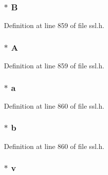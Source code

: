 \subsubsection[{\texorpdfstring{B}{B}}]{ $\ast$ B}\hypertarget{structsrp__ctx__st_af004f723529f12aa9f6eba50d907cfc6}{}\label{structsrp__ctx__st_af004f723529f12aa9f6eba50d907cfc6}


Definition at line 859 of file ssl.\+h.

\subsubsection[{\texorpdfstring{A}{A}}]{ $\ast$ A}\hypertarget{structsrp__ctx__st_a14b5ee5b9cc93634ae591ff33a985689}{}\label{structsrp__ctx__st_a14b5ee5b9cc93634ae591ff33a985689}


Definition at line 859 of file ssl.\+h.

\subsubsection[{\texorpdfstring{a}{a}}]{ $\ast$ a}\hypertarget{structsrp__ctx__st_a2e67c857a6d3ab552fcf1269a040c20f}{}\label{structsrp__ctx__st_a2e67c857a6d3ab552fcf1269a040c20f}


Definition at line 860 of file ssl.\+h.

\subsubsection[{\texorpdfstring{b}{b}}]{ $\ast$ b}\hypertarget{structsrp__ctx__st_a4f9b0f3e3a494b67b819fb0fb31e6eca}{}\label{structsrp__ctx__st_a4f9b0f3e3a494b67b819fb0fb31e6eca}


Definition at line 860 of file ssl.\+h.

\subsubsection[{\texorpdfstring{v}{v}}]{ $\ast$ v}\hypertarget{structsrp__ctx__st_a449bad7793a9afed36db8c4ef3a71a41}{}\label{structsrp__ctx__st_a449bad7793a9afed36db8c4ef3a71a41}


